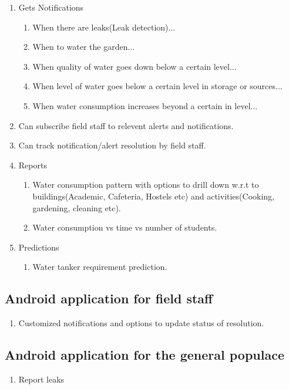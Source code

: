 \documentclass[paper=a4, fontsize=11pt]{scrartcl} %
\numberwithin{equation}{section} %
\numberwithin{figure}{section} %
\numberwithin{table}{section} %
\begin{document}
\begin{enumerate}
\item 
Gets Notifications
\begin{enumerate}
\item
When there are leaks(Leak detection)...
\item
When to water the garden...
\item
When quality of water goes down below a certain level...
\item
When level of water goes below a certain level in storage or sources...
\item
When water consumption increases beyond a certain in level...
\end{enumerate}
\item
Can subscribe field staff to relevent alerts and notifications.
\item
Can track notification/alert resolution by field staff.
\item
Reports
\begin{enumerate}
\item
Water consumption pattern with options to drill down w.r.t to buildings(Academic, Cafeteria, Hostels etc) and activities(Cooking, gardening, cleaning etc).
\item
Water consumption vs time vs number of students.
\end{enumerate}
\item
Predictions
\begin{enumerate}
\item
Water tanker requirement prediction.
\end{enumerate}
\end{enumerate}

\subsection{Android application for field staff}
\begin{enumerate}
\item
Customized notifications and options to update status of resolution.
\end{enumerate}

\subsection{Android application for the general populace}
\begin{enumerate}
\item
Report leaks
\end{enumerate}
\end{document}
